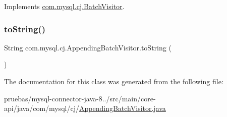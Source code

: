 Implements \mbox{\hyperlink{interfacecom_1_1mysql_1_1cj_1_1_batch_visitor_a29941741b1d70e0845b7164b8141231a}{com.\+mysql.\+cj.\+Batch\+Visitor}}.

\mbox{\label{classcom_1_1mysql_1_1cj_1_1_appending_batch_visitor_a69995f09d9262780787f48744a145b21}} 
\subsubsection{\texorpdfstring{to\+String()}{toString()}}
{\footnotesize\ttfamily String com.\+mysql.\+cj.\+Appending\+Batch\+Visitor.\+to\+String (\begin{DoxyParamCaption}{ }\end{DoxyParamCaption})}



The documentation for this class was generated from the following file\+:\begin{DoxyCompactItemize}
\item 
pruebas/mysql-\/connector-\/java-\/8../src/main/core-\/api/java/com/mysql/cj/\mbox{\hyperlink{_appending_batch_visitor_8java}{Appending\+Batch\+Visitor.\+java}}\end{DoxyCompactItemize}
